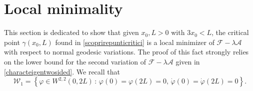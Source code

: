 \documentclass[11pt]{amsart}
\newcommand{\A}{\mathcal A}
\newcommand{\F}{\mathcal F}
\newcommand{\Lag}{\mathscr{L}}
\newcommand{\cW}{\mathcal{W}_1}
\newcommand{\cV}{\mathcal{V}}
\renewcommand{\phi}{\varphi}
\theoremstyle{definition}
\theoremstyle{remark}
\numberwithin{equation}{section}
\begin{document}
\section{Local minimality}\label{sec_locmin}
This section is dedicated to show that given $x_0, L > 0$ with $3x_0 < L$, the critical point $\gamma(x_0,L)$ found in \cref{scoprirepunticritici} is a local minimizer of $\F-\lambda\A$ with respect to normal geodesic variations. The proof of this fact strongly relies on the lower bound for the second variation of $\F-\lambda\A$ given in \cref{characteigentwosided}.
We recall that 
\begin{equation*}
\mathcal W_1=\left\{\varphi\in W^{2,2}(0,2L)\,:\,\varphi(0)=\varphi(2L)=0,\,\dot\varphi(0)=\dot\varphi(2L)=0\right\}.
\end{equation*} 

\end{document}
